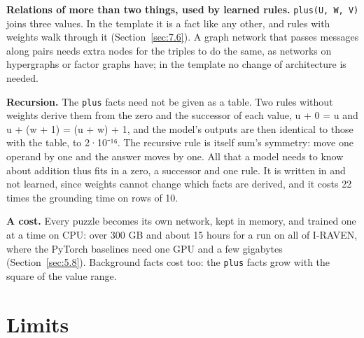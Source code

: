 \textbf{Relations of more than two things, used by learned rules.} \texttt{plus(U, W, V)} joins three values. In the template it is a fact like any other, and rules with weights walk through it (Section~\ref{sec:7.6}). A graph network that passes messages along pairs needs extra nodes for the triples to do the same, as networks on hypergraphs or factor graphs have; in the template no change of architecture is needed.

\textbf{Recursion.} The \texttt{plus} facts need not be given as a table. Two rules without weights derive them from the zero and the successor of each value, u + 0 = u and u + (w + 1) = (u + w) + 1, and the model's outputs are then identical to those with the table, to 2·10⁻¹⁶. The recursive rule is itself sum's symmetry: move one operand by one and the answer moves by one. All that a model needs to know about addition thus fits in a zero, a successor and one rule. It is written in and not learned, since weights cannot change which facts are derived, and it costs 22 times the grounding time on rows of 10.

\textbf{A cost.} Every puzzle becomes its own network, kept in memory, and trained one at a time on CPU: over 300 GB and about 15 hours for a run on all of I-RAVEN, where the PyTorch baselines need one GPU and a few gigabytes (Section~\ref{sec:5.8}). Background facts cost too: the \texttt{plus} facts grow with the square of the value range.

\section{Limits}\label{sec:8.6}

